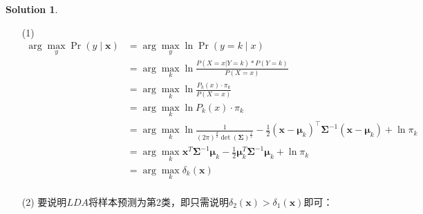 \documentclass[a4paper,UTF8]{article}
\theoremstyle{definition}
\newtheorem*{solution}{Solution}
\begin{document}
\begin{solution}
	\begin{enumerate}
		\item [(1)]
		      \begin{align*}
			      \arg \max_y \Pr(y\mid \bm{x}) & = \arg \max_y \ln \Pr(y=k\mid x)                                                                                                                                                                                                          \\
			                                    & = \arg \max_k \ln \frac{P(X = x | Y = k)*P(Y=k)}{P(X = x)}                                                                                                                                                                                \\
			                                    & = \arg \max_k \ln \frac{P_{k}(x) \cdot \pi_{k}}{P(X=x)}                                                                                                                                                                                   \\
			                                    & = \arg \max_k \ln P_{k}(x) \cdot \pi_{k}                                                                                                                                                                                                  \\
			                                    & = \arg \max_k \ln \frac{1}{(2 \pi)^{\frac{d}{2}} \det(\bm{\Sigma})^{\frac{1}{2}}}-\frac{1}{2}\left(\boldsymbol{x}-\boldsymbol{\mu}_{k}\right)^{\top} \boldsymbol{\Sigma}^{-1}\left(\boldsymbol{x}-\boldsymbol{\mu}_{k}\right)+\ln \pi_{k} \\
			                                    & = \arg \max_k \boldsymbol{x}^{T} \boldsymbol{\Sigma}^{-1} \boldsymbol{\mu}_{k}-\frac{1}{2} \boldsymbol{\mu}_{k}^{T} \boldsymbol{\Sigma}^{-1} \boldsymbol{\mu}_{k}+\ln \pi_{k}                                                             \\
			                                    & = \arg \max_k \delta_k(\bm{x})                                                                                                                                                                                                            \\
		      \end{align*}
		\item [(2)]
		      要说明$LDA$将样本预测为第2类，即只需说明$\delta_2(\bm{x})> \delta_1(\bm{x})$即可：

\end{enumerate}
\end{solution}
\end{document}
